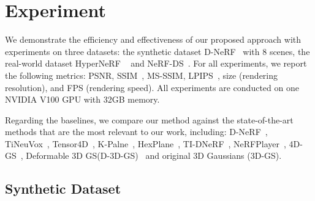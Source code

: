 \section{Experiment}
\newcommand{\citeInTab}[1]{}

We demonstrate the efficiency and effectiveness of our proposed approach with experiments on three datasets: the synthetic dataset D-NeRF~\cite{D-NeRF} with 8 scenes, the real-world dataset HyperNeRF ~\cite{Nerfies} and NeRF-DS~\cite{NeRF-DS}. 
For all experiments, we report the following metrics: PSNR, SSIM~\cite{SSIM}, MS-SSIM,  LPIPS~\cite{LPIPS}, size (rendering resolution), and FPS (rendering speed). 
All experiments are conducted on one NVIDIA V100 GPU with 32GB memory.


Regarding the baselines, we compare our method against the state-of-the-art methods that are the most relevant to our work, including: D-NeRF~\cite{D-NeRF}, TiNeuVox~\cite{TiNeuVox}, Tensor4D~\cite{Tensor4D}, K-Palne~\cite{KPlanes},  HexPlane~\cite{HexPlane}, TI-DNeRF~\cite{TI-DNeRF}, NeRFPlayer~\cite{NeRFPlayer}, 4D-GS~\cite{RealTime4DGS}, Deformable 3D GS(D-3D-GS)~\cite{Deformable3DGS} and original 3D Gaussians (3D-GS). 


\subsection{Synthetic Dataset}

